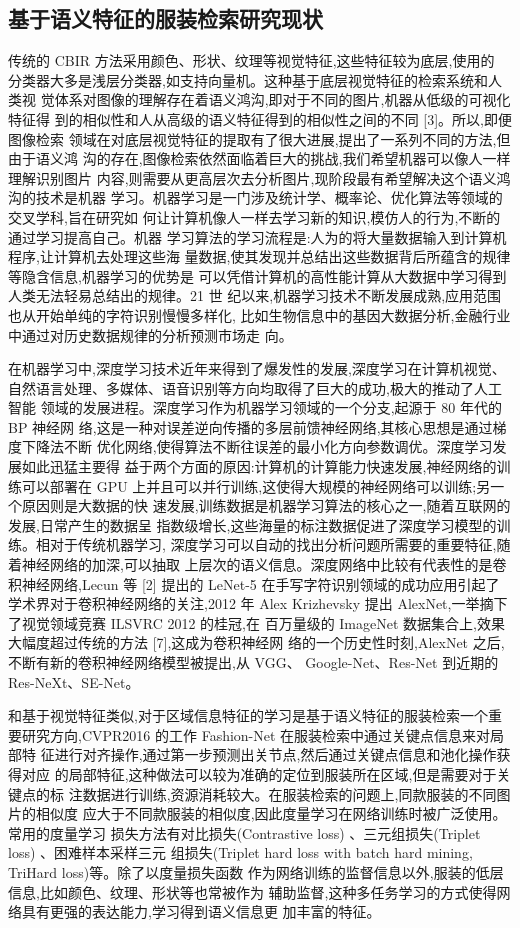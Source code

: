 \subsection{基于语义特征的服装检索研究现状}
传统的 CBIR 方法采用颜色、形状、纹理等视觉特征,这些特征较为底层,使用的
分类器大多是浅层分类器,如支持向量机。这种基于底层视觉特征的检索系统和人类视
觉体系对图像的理解存在着语义鸿沟,即对于不同的图片,机器从低级的可视化特征得
到的相似性和人从高级的语义特征得到的相似性之间的不同 [3]。所以,即便图像检索
领域在对底层视觉特征的提取有了很大进展,提出了一系列不同的方法,但由于语义鸿
沟的存在,图像检索依然面临着巨大的挑战,我们希望机器可以像人一样理解识别图片
内容,则需要从更高层次去分析图片,现阶段最有希望解决这个语义鸿沟的技术是机器
学习。机器学习是一门涉及统计学、概率论、优化算法等领域的交叉学科,旨在研究如
何让计算机像人一样去学习新的知识,模仿人的行为,不断的通过学习提高自己。机器
学习算法的学习流程是:人为的将大量数据输入到计算机程序,让计算机去处理这些海
量数据,使其发现并总结出这些数据背后所蕴含的规律等隐含信息,机器学习的优势是
可以凭借计算机的高性能计算从大数据中学习得到人类无法轻易总结出的规律。21 世
纪以来,机器学习技术不断发展成熟,应用范围也从开始单纯的字符识别慢慢多样化,
比如生物信息中的基因大数据分析,金融行业中通过对历史数据规律的分析预测市场走
向。

在机器学习中,深度学习技术近年来得到了爆发性的发展,深度学习在计算机视觉、
自然语言处理、多媒体、语音识别等方向均取得了巨大的成功,极大的推动了人工智能
领域的发展进程。深度学习作为机器学习领域的一个分支,起源于 80 年代的 BP 神经网
络,这是一种对误差逆向传播的多层前馈神经网络,其核心思想是通过梯度下降法不断
优化网络,使得算法不断往误差的最小化方向参数调优。深度学习发展如此迅猛主要得
益于两个方面的原因:计算机的计算能力快速发展,神经网络的训练可以部署在 GPU
上并且可以并行训练,这使得大规模的神经网络可以训练;另一个原因则是大数据的快
速发展,训练数据是机器学习算法的核心之一,随着互联网的发展,日常产生的数据呈
指数级增长,这些海量的标注数据促进了深度学习模型的训练。相对于传统机器学习,
深度学习可以自动的找出分析问题所需要的重要特征,随着神经网络的加深,可以抽取
上层次的语义信息。深度网络中比较有代表性的是卷积神经网络,Lecun 等 [2] 提出的
LeNet-5 在手写字符识别领域的成功应用引起了学术界对于卷积神经网络的关注,2012
年 Alex Krizhevsky 提出 AlexNet,一举摘下了视觉领域竞赛 ILSVRC 2012 的桂冠,在
百万量级的 ImageNet 数据集合上,效果大幅度超过传统的方法 [7],这成为卷积神经网
络的一个历史性时刻,AlexNet 之后,不断有新的卷积神经网络模型被提出,从 VGG、
Google-Net、Res-Net 到近期的 Res-NeXt、SE-Net。

和基于视觉特征类似,对于区域信息特征的学习是基于语义特征的服装检索一个重
要研究方向,CVPR2016 的工作 Fashion-Net 在服装检索中通过关键点信息来对局部特
征进行对齐操作,通过第一步预测出关节点,然后通过关键点信息和池化操作获得对应
的局部特征,这种做法可以较为准确的定位到服装所在区域,但是需要对于关键点的标
注数据进行训练,资源消耗较大。在服装检索的问题上,同款服装的不同图片的相似度
应大于不同款服装的相似度,因此度量学习在网络训练时被广泛使用。常用的度量学习
损失方法有对比损失(Contrastive loss)
、三元组损失(Triplet loss)
、困难样本采样三元
组损失(Triplet hard loss with batch hard mining, TriHard loss)等。除了以度量损失函数
作为网络训练的监督信息以外,服装的低层信息,比如颜色、纹理、形状等也常被作为
辅助监督,这种多任务学习的方式使得网络具有更强的表达能力,学习得到语义信息更
加丰富的特征。

